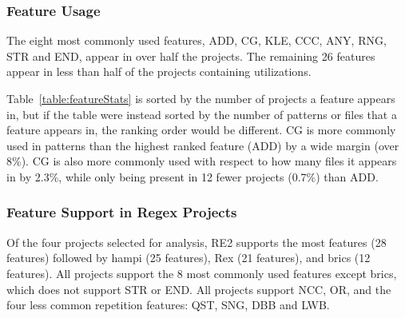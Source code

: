 \subsubsection{Feature Usage}
\label{sec:featureUsage}
The eight most commonly used features, ADD, CG, KLE, CCC, ANY, RNG, STR and END,
appear in over half the projects. The remaining 26 features appear in less than half of the projects containing utilizations.


Table~\ref{table:featureStats} is sorted by the number of projects a feature appears in, but if the table were instead sorted by the number of patterns or files that a feature appears in, the ranking order would be different.  CG is more commonly used in patterns than the highest ranked feature (ADD) by a wide margin (over 8\%).  CG is also more commonly used with respect to how many files it appears in by 2.3\%, while only being present in 12 fewer projects (0.7\%) than ADD.




\subsubsection{Feature Support in Regex Projects}
Of the four projects selected for analysis, RE2 supports the most features (28 features) followed by hampi (25 features),  Rex (21 features), and brics (12 features).  All projects support the 8 most commonly used features except brics, which does not support STR or END.  All projects support NCC, OR, and the four less common repetition features: QST, SNG, DBB and LWB.

